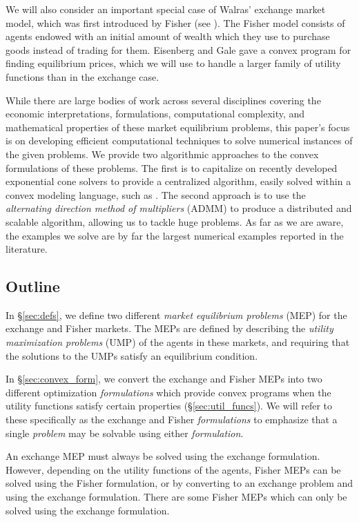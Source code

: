 \documentclass[12pt]{article}
\begin{document}
We will also consider an important special case of Walras' exchange market model,
which was first introduced by Fisher (see \cite{brainard2000compute}).
The Fisher model consists of agents endowed with
an initial amount of wealth which they use to purchase goods instead of trading
for them. Eisenberg and Gale \cite{eisenberg1959consensus, gale1960theory,
eisenberg1961aggregation} gave a convex program for finding equilibrium prices,
which we will use to handle a larger family of utility functions than in the
exchange case.

While there are large bodies of work across several disciplines covering the
economic interpretations, formulations, computational complexity, and
mathematical properties of these market equilibrium problems, this paper's
focus is on developing efficient computational techniques to solve
numerical instances of the given problems.
We provide two algorithmic approaches to the convex formulations
of these problems. The first is to capitalize on recently
developed exponential cone solvers \cite{scs} to provide a centralized
algorithm, easily solved within a convex modeling language, such as \cite{cvxpy,
cvx}. The second approach is to use the \emph{alternating direction method of
multipliers} (ADMM) \cite{boyd2011distributed} to produce a distributed and
scalable algorithm, allowing us to tackle huge problems.
As far as we are aware, the examples we solve are by far the largest
numerical examples reported in the literature.


\subsection{Outline}

In \S\ref{sec:defs}, we define two different \emph{market equilibrium problems}
(MEP) for the exchange and Fisher markets. The MEPs are defined by describing
the \emph{utility maximization problems} (UMP) of the agents in these markets,
and requiring that the solutions to the UMPs satisfy an equilibrium condition.

In \S\ref{sec:convex_form}, we convert the exchange and Fisher MEPs into two
different optimization \emph{formulations} which provide convex programs when
the utility functions satisfy certain properties (\S\ref{sec:util_funcs}). We
will refer to these specifically as the exchange and Fisher \emph{formulations}
to emphasize that a single \emph{problem} may be solvable using either
\emph{formulation}.

An exchange MEP must always be solved using the exchange formulation. However,
depending on the utility functions of the agents, Fisher MEPs can be solved
using the Fisher formulation, or by converting to an exchange problem and using
the exchange formulation. There are some Fisher MEPs which can only be solved
using the exchange formulation.
\end{document}
